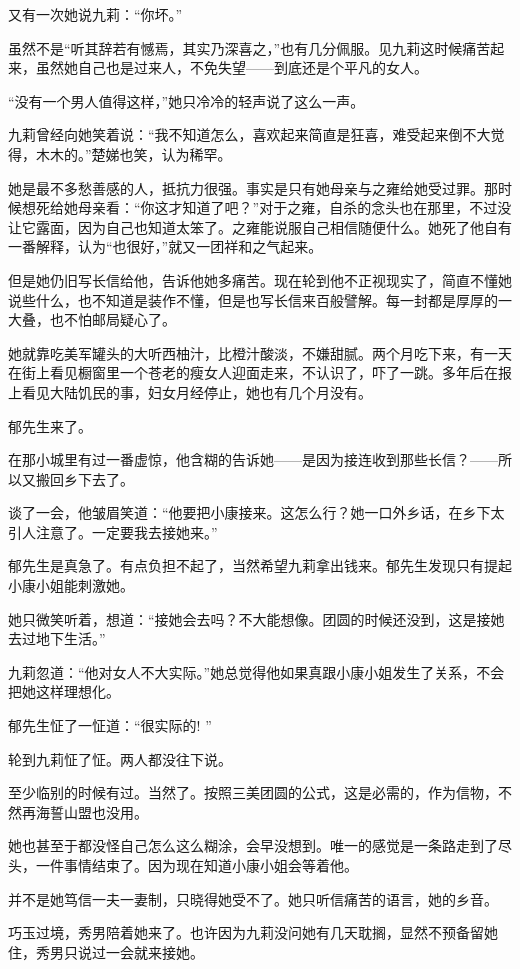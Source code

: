 \par 又有一次她说九莉：“你坏。”
\par 虽然不是“听其辞若有憾焉，其实乃深喜之，”也有几分佩服。见九莉这时候痛苦起来，虽然她自己也是过来人，不免失望——到底还是个平凡的女人。
\par “没有一个男人值得这样，”她只冷冷的轻声说了这么一声。
\par 九莉曾经向她笑着说：“我不知道怎么，喜欢起来简直是狂喜，难受起来倒不大觉得，木木的。”楚娣也笑，认为稀罕。
\par 她是最不多愁善感的人，抵抗力很强。事实是只有她母亲与之雍给她受过罪。那时候想死给她母亲看：“你这才知道了吧？”对于之雍，自杀的念头也在那里，不过没让它露面，因为自己也知道太笨了。之雍能说服自己相信随便什么。她死了他自有一番解释，认为“也很好，”就又一团祥和之气起来。
\par 但是她仍旧写长信给他，告诉他她多痛苦。现在轮到他不正视现实了，简直不懂她说些什么，也不知道是装作不懂，但是也写长信来百般譬解。每一封都是厚厚的一大叠，也不怕邮局疑心了。
\par 她就靠吃美军罐头的大听西柚汁，比橙汁酸淡，不嫌甜腻。两个月吃下来，有一天在街上看见橱窗里一个苍老的瘦女人迎面走来，不认识了，吓了一跳。多年后在报上看见大陆饥民的事，妇女月经停止，她也有几个月没有。
\par 郁先生来了。
\par 在那小城里有过一番虚惊，他含糊的告诉她——是因为接连收到那些长信？——所以又搬回乡下去了。
\par 谈了一会，他皱眉笑道：“他要把小康接来。这怎么行？她一口外乡话，在乡下太引人注意了。一定要我去接她来。”
\par 郁先生是真急了。有点负担不起了，当然希望九莉拿出钱来。郁先生发现只有提起小康小姐能刺激她。
\par 她只微笑听着，想道：“接她会去吗？不大能想像。团圆的时候还没到，这是接她去过地下生活。”
\par 九莉忽道：“他对女人不大实际。”她总觉得他如果真跟小康小姐发生了关系，不会把她这样理想化。
\par 郁先生怔了一怔道：“很实际的! ”
\par 轮到九莉怔了怔。两人都没往下说。
\par 至少临别的时候有过。当然了。按照三美团圆的公式，这是必需的，作为信物，不然再海誓山盟也没用。
\par 她也甚至于都没怪自己怎么这么糊涂，会早没想到。唯一的感觉是一条路走到了尽头，一件事情结束了。因为现在知道小康小姐会等着他。
\par 并不是她笃信一夫一妻制，只晓得她受不了。她只听信痛苦的语言，她的乡音。
\par 巧玉过境，秀男陪着她来了。也许因为九莉没问她有几天耽搁，显然不预备留她住，秀男只说过一会就来接她。
